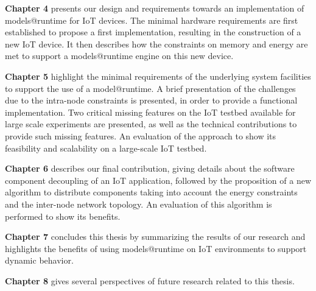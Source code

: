 \textbf{Chapter 4} presents our design and requirements towards an implementation of models@runtime for IoT devices.
The minimal hardware requirements are first established to propose a first implementation, resulting in the construction of a new IoT device.
It then describes how the constraints on memory and energy are met to support a models@runtime engine on this new device.

\textbf{Chapter 5} highlight the minimal requirements of the underlying system facilities to support the use of a model@runtime.
A brief presentation of the challenges due to the intra-node constraints is presented, in order to provide a functional implementation.
Two critical missing features on the IoT testbed available for large scale experiments are presented, as well as the technical contributions to provide such missing features.
An evaluation of the approach to show its feasibility and scalability on a large-scale IoT testbed.

\textbf{Chapter 6} describes our final contribution, giving details about the software component decoupling of an IoT application, followed by the proposition of a new algorithm to distribute components taking into account the energy constraints and the inter-node network topology.
An evaluation of this algorithm is performed to show its benefits.

\textbf{Chapter 7} concludes this thesis by summarizing the results of our research and highlights the benefits of using models@runtime on IoT environments to support dynamic behavior.

\textbf{Chapter 8} gives several perspectives of future research related to this thesis.